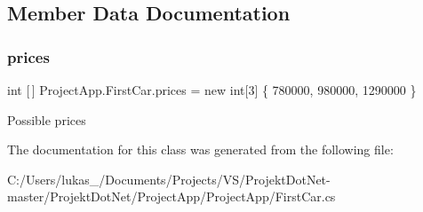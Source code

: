 \subsection{Member Data Documentation}
\mbox{\label{class_project_app_1_1_first_car_acba0828ff81bed0ec72f7d5d786fbc8d}} 
\subsubsection{\texorpdfstring{prices}{prices}}
{\footnotesize\ttfamily int \mbox{[}$\,$\mbox{]} Project\+App.\+First\+Car.\+prices = new int\mbox{[}3\mbox{]} \{ 780000, 980000, 1290000 \}}



Possible prices 



The documentation for this class was generated from the following file\+:\begin{DoxyCompactItemize}
\item 
C\+:/\+Users/lukas\+\_/\+Documents/\+Projects/\+V\+S/\+Projekt\+Dot\+Net-\/master/\+Projekt\+Dot\+Net/\+Project\+App/\+Project\+App/First\+Car.\+cs\end{DoxyCompactItemize}

